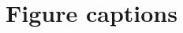 \documentclass[utf8]{FrontiersinHarvard} %
\begin{document}

\section*{Figure captions}


%
%   
%

\end{document}
